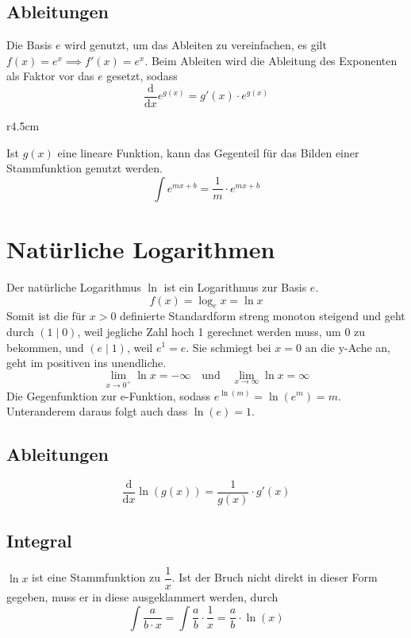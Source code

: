 \documentclass{article}
\begin{document}
\subsection{Ableitungen} 
Die Basis $e$ wird genutzt, um das Ableiten zu vereinfachen, es gilt $f(x)=e^x \implies f'(x)=e^x$. \newline
Beim Ableiten wird die Ableitung des Exponenten als Faktor vor das $e$ gesetzt, sodass 
\[
 \frac{\mathrm{d}}{\mathrm{d}x} e^{g(x)} = g'(x) \cdot e^{g(x)} 
\]  
\begin{wrapfigure}{r}{4.5cm}
 \centering
\end{wrapfigure} 
Ist $g(x)$ eine lineare Funktion, kann das Gegenteil für das Bilden einer Stammfunktion genutzt werden. 
\[
 \int e^{mx+b} = \frac{1}{m} \cdot e^{mx+b}
\] 
\section{Natürliche Logarithmen}  
Der natürliche Logarithmus $\ln$ ist ein Logarithmus zur Basis $e$.
\[
 f(x) = \log_e{x} = \ln{x}
\] 
Somit ist die für $x>0$ definierte Standardform streng monoton steigend und geht durch ${(1 \mid 0)}$, weil jegliche Zahl hoch 1 gerechnet werden muss, um 0 zu bekommen, und $(e \mid 1)$, weil $e^1=e$. \newline
Sie schmiegt bei $x=0$ an die y-Ache an, geht im positiven ins unendliche.
\[
 \lim_{x \to 0^+} \ln x = -\infty
 \quad \text{und} \quad
 \lim_{x \to \infty} \ln x= \infty
\] 
Die Gegenfunktion zur e-Funktion, sodass $e^{\ln(m)}=\ln{(e^m)}=m$. Unteranderem daraus folgt auch dass $\ln(e)=1$.
\subsection{Ableitungen} 
\[
 \frac{\mathrm{d}}{\mathrm{d}x} \ln{(g(x))} = \frac{1}{g(x)} \cdot g'(x) 
\] 
\subsection{Integral}
$\ln{x}$ ist eine Stammfunktion zu $\dfrac{1}{x}$. Ist der Bruch nicht direkt in dieser Form gegeben, muss er in diese ausgeklammert werden, durch
\[
 \int \frac{a}{b \cdot x} =
 \int \frac{a}{b} \cdot \frac{1}{x} =
 \frac{a}{b} \cdot \ln(x)
\] 
 
\end{document}
